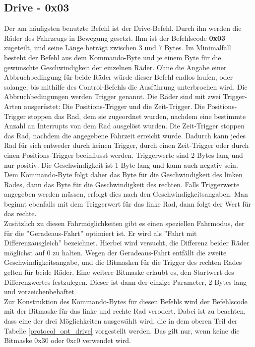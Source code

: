 \subsection{Drive - 0x03}
Der am häufigsten benutzte Befehl ist der Drive-Befehl. Durch ihn werden die Räder des Fahrzeugs
in Bewegung gesetzt. Ihm ist der Befehlscode \textbf{0x03} zugeteilt, und seine Länge beträgt zwischen 3
und 7 Bytes. Im Minimalfall besteht der Befehl aus dem Kommando-Byte und je einem Byte für
die gewünschte Geschwindigkeit der einzelnen Räder. Ohne die Angabe einer Abbruchbedingung für
beide Räder würde dieser Befehl endlos laufen, oder solange, bis mithilfe des Control-Befehls
die Ausführung unterbrochen wird. Die Abbruchbedingungen werden Trigger genannt. 
Die Räder sind mit zwei Trigger-Arten ausgerüstet:
Die Positions-Trigger und die Zeit-Trigger. Die Positions-Trigger stoppen
das Rad, dem sie zugeordnet wurden, nachdem eine bestimmte Anzahl an Interrupts von dem Rad
ausgelöst wurden. Die Zeit-Trigger stoppen das Rad, nachdem die angegebene Fahrzeit erreicht
wurde. 
Dadurch kann jedes Rad für sich entweder durch keinen Trigger, durch einen Zeit-Trigger
oder durch einen Positions-Trigger beeinflusst werden.
Triggerwerte sind
2 Bytes lang und nur positiv. Die Geschwindigkeit ist 1 Byte lang und kann auch negativ sein.
Dem Kommando-Byte folgt daher das Byte für die Geschwindigkeit des linken Rades, dann
das Byte für die Geschwindigkeit des rechten. Falls Triggerwerte angegeben werden müssen,
erfolgt dies nach den Geschwindigkeitsangaben.
Man beginnt ebenfalls mit dem Triggerwert für das linke Rad, dann folgt der
Wert für das rechte.\\
Zusätzlich zu diesen Fahrmöglichkeiten gibt es einen speziellen Fahrmodus, der für
die ''Geradeaus-Fahrt'' optimiert ist. Er wird als ''Fahrt mit Differenzausgleich''
bezeichnet. Hierbei wird versucht, die Differenz beider Räder möglichst auf 0 zu
halten. Wegen der Geradeaus-Fahrt entfällt die zweite Geschwindigkeitsangabe, und 
die Bitmasken für die Trigger des rechten Rades gelten für beide Räder. Eine weitere
Bitmaske erlaubt es, den Startwert des Differenzwertes festzulegen. Dieser ist dann
der einzige Parameter, 2 Bytes lang und vorzeichenbehaftet.\\
Zur Konstruktion des Kommando-Bytes für diesen Befehls wird der Befehlscode mit der Bitmaske
für das linke und rechte Rad verodert.
Dabei ist zu beachten, dass eine der drei Möglichkeiten
ausgewählt wird, die in dem oberen Teil der Tabelle \ref{protocol_opt_drive} vorgestellt werden.
Das gilt nur, wenn keine die Bitmaske 0x30 oder 0xc0 verwendet wird.
